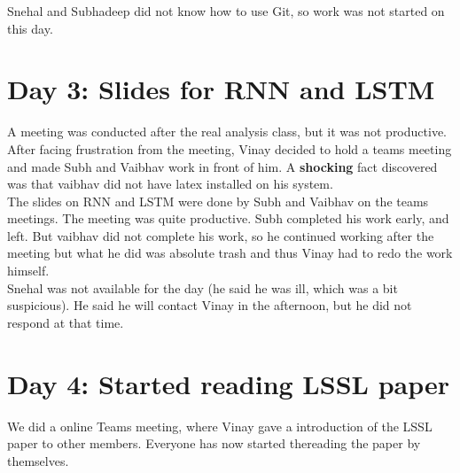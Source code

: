 \documentclass[11pt]{scrartcl}
\begin{document}
Snehal and Subhadeep did not know how to use Git, so work was not started on this day.

\section{Day 3: Slides for RNN and LSTM}
A meeting was conducted after the real analysis class, but it was not productive. \\

After facing frustration from the meeting, Vinay decided to hold a teams meeting and made Subh and Vaibhav work in front of him. A \textbf{shocking} fact discovered was that vaibhav did not have latex installed on his system. \\

The slides on RNN and LSTM were done by Subh and Vaibhav on the teams meetings. The meeting was quite productive. Subh completed his work early, and left. But vaibhav did not complete his work, so he continued working after the meeting but what he did was absolute trash and thus Vinay had to redo the work himself.\\

Snehal was not available for the day (he said he was ill, which was a bit suspicious). He said he will contact Vinay in the afternoon, but he did not respond at that time.


\section{Day 4: Started reading LSSL paper}
We did a online Teams meeting, where Vinay gave a introduction of the LSSL paper to other members. Everyone has now started thereading the paper by themselves.
\end{document}
